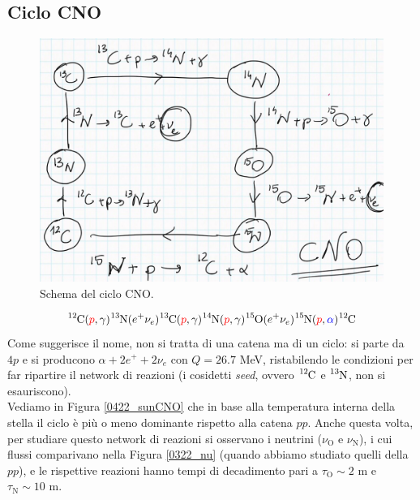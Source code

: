 \subsection{Ciclo CNO}
\begin{figure}[!h]
	\centering
	\includegraphics[scale=0.5]{Immagini/0422_CNOscheme.png}
	\caption{Schema del ciclo CNO.}
	\label{0422_CNOsch}
\end{figure}
$$\ce{^{12}C}(\textcolor{red}{p},\gamma)\ce{^{13}N}(e^+\nu_e)\ce{^{13}C}(\textcolor{red}{p},\gamma)\ce{^{14}N}(\textcolor{red}{p},\gamma)\ce{^{15}O}(e^+\nu_e)\ce{^{15}N}(\textcolor{red}{p},\textcolor{blue}{\alpha})\ce{^{12}C}$$
\noindent Come suggerisce il nome, non si tratta di una catena ma di un ciclo: si parte da $4p$ e si producono $\alpha + 2 e^+ + 2 \nu_e$ con $Q=26.7$ MeV, ristabilendo le condizioni per far ripartire il network di reazioni (i cosidetti \textit{seed}, ovvero $\ce{^{12}C}$ e $\ce{^{13}N}$, non si esauriscono).\\ 
Vediamo in Figura \ref{0422_sunCNO} che in base alla temperatura interna della stella il ciclo è più o meno dominante rispetto alla catena $pp$. Anche questa volta, per studiare questo network di reazioni si osservano i neutrini ($\nu_{\mbox{O}}$ e $\nu_{\mbox{N}}$), i cui flussi comparivano nella Figura \ref{0322_nu} (quando abbiamo studiato quelli della $pp$), e le rispettive reazioni hanno tempi di decadimento pari a $\tau_{\mbox{O}} \sim 2$ m e $\tau_{\mbox{N}} \sim 10$ m.

